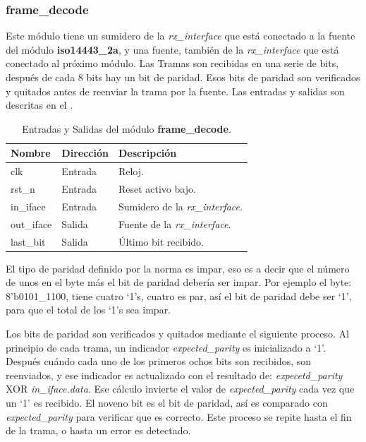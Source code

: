 \documentclass[a4paper, twoside, 11pt]{report}
\begin{document}
\FloatBarrier
\subsubsection{frame\_decode}

Este módulo tiene un sumidero de la \textit{rx\_interface} que está conectado a la fuente del módulo \textbf{iso14443\_2a}, y una fuente, también de la \textit{rx\_interface} que está conectado al próximo módulo. Las Tramas son recibidas en una serie de bits, después de cada 8 bits hay un bit de paridad. Esos bits de paridad son verificados y quitados antes de reenviar la trama por la fuente. Las entradas y salidas son descritas en el .

\begin{table}[htb]
  \centering
  \tablezebra
  \begin{tabulary}{\linewidth}{l|l|L}
    \setcounter{rownum}{0}
    \textbf{Nombre}&\textbf{Dirección}&\textbf{Descripción} \\
    \hline
    clk&Entrada&Reloj. \\
    rst\_n&Entrada&Reset activo bajo. \\
    in\_iface&Entrada&Sumidero de la \textit{rx\_interface}. \\
    out\_iface&Salida&Fuente de la \textit{rx\_interface}. \\
    last\_bit&Salida&Último bit recibido. \\
  \end{tabulary}
  \caption{Entradas y Salidas del módulo \textbf{frame\_decode}.}
  \label{tab:ports_frame_decode}
\end{table}

El tipo de paridad definido por la norma es impar, eso es a decir que el número de unos en el byte más el bit de paridad debería ser impar. Por ejemplo el byte: 8’b0101\_1100, tiene cuatro ‘1’s, cuatro es par, así el bit de paridad debe ser ‘1’, para que el total de los ‘1’s sea impar.

Los bits de paridad son verificados y quitados mediante el siguiente proceso. Al principio de cada trama, un indicador \textit{expected\_parity} es inicializado a ‘1’. Después cuándo cada uno de los primeros ochos bits son recibidos, son reenviados, y ese indicador es actualizado con el resultado de: \textit{expecetd\_parity} XOR \textit{in\_iface.data}. Ese cálculo invierte el valor de \textit{expected\_parity} cada vez que un ‘1’ es recibido. El noveno bit es el bit de paridad, así es comparado con \textit{expected\_parity} para verificar que es correcto. Este proceso se repite hasta el fin de la trama, o hasta un error es detectado. 
\end{document}
